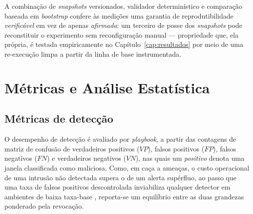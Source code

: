 A combinação de \textit{snapshots} versionados, validador determinístico e
comparação baseada em \textit{bootstrap} confere às medições uma garantia de
reprodutibilidade \emph{verificável} em vez de apenas \emph{afirmada}: um
terceiro de posse dos \textit{snapshots} pode reconstituir o experimento sem
reconfiguração manual --- propriedade que, ela própria, é testada empiricamente
no Capítulo~\ref{cap:resultados} por meio de uma re-execução limpa a partir da
linha de base instrumentada.

\section{Métricas e Análise Estatística}
\label{sec:met-metricas}

\subsection{Métricas de detecção}

O desempenho de detecção é avaliado por \textit{playbook}, a partir das contagens
de matriz de confusão de verdadeiros positivos ($\mathit{VP}$), falsos positivos
($\mathit{FP}$), falsos negativos ($\mathit{FN}$) e verdadeiros negativos
($\mathit{VN}$), nas quais um \emph{positivo} denota uma janela classificada como
maliciosa. Como, em caça a ameaças, o custo operacional de uma intrusão não
detectada supera o de um alerta supérfluo, ao passo que uma taxa de falsos
positivos descontrolada inviabiliza qualquer detector em ambientes de baixa
taxa-base \cite{dolan-gavitt2025}, reporta-se um equilíbrio entre as duas
grandezas ponderado pela revocação.


